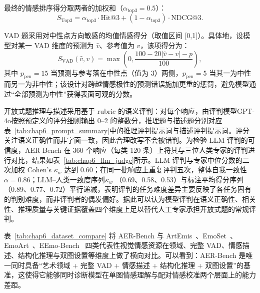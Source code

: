 最终的情感排序得分取两者的加权和（$\alpha_{\text{top3}}=0.5$）：
\begin{equation}
S_{\text{Top3}}=\alpha_{\text{top3}}\cdot\mathrm{Hit@3}+(1-\alpha_{\text{top3}})\cdot\mathrm{NDCG@3}.
\label{eq:chap6_stop3}
\end{equation}

VAD 题采用对中性点方向敏感的均值情感得分（取值区间 [0,1]）。具体地，设模型对某一 VAD 维度的预测为 $\hat{v}$、参考值为 $v$，该项得分为：
\begin{equation}
S_{\text{VAD}}(\hat{v},v)=\max\left(0,\frac{100-20|\hat{v}-v|-p}{100}\right),
\label{eq:chap6_svad}
\end{equation}
其中 $p_{\text{pen}}=15$ 当预测与参考落在中性点（值为 3）两侧，$p_{\text{pen}}=5$ 当其一为中性而另一为非中性；该设计对跨越情感极性的预测错误施加更重的惩罚，避免模型通过“全部预测为中性”获得表面可观的分数。

开放式题推理与描述采用基于 rubric 的语义评判：对每个响应，由评判模型GPT-4o按照预定义的评分细则输出 0--2 的整数分，推理题与描述题分别对应表~\ref{tab:chap6_prompt_summary}中的推理评判提示词与描述评判提示词。评分关注语义正确性而非字面一致，因此合理改写不会被错判。为检验 LLM 评判的可信度，AER-Bench 在 360 个响应（每类 120 条）上将其与三位人类专家的评判进行对比，结果如表~\ref{tab:chap6_llm_judge}所示。LLM 评判与专家中位分数的二次加权 Cohen's $\kappa_w$ 达到 0.60；在同一批响应上重复评判五次，整体自我一致性 $\alpha=0.86$；LLM--人类一致度序列$\kappa_w$ （0.69、0.58、0.53）与标注平均得分序列（0.89、0.77、0.72）平行递减，表明评判的任务难度差异主要反映了各任务固有的判别难度，而非评判者的偶发偏好。据此可以认为模型评判在语义正确性、相关性、推理质量与关键证据覆盖四个维度上足以替代人工专家承担开放式题的常规评判。

表~\ref{tab:chap6_dataset_compare} 将 AER-Bench 与 ArtEmis~\cite{achlioptas2021artemis}、EmoSet~\cite{yang2023emoset}、EmoArt~\cite{emoart2025}、EEmo-Bench~\cite{eemobench2025} 四类代表性视觉情感资源在领域、完整 VAD、情感描述、结构化推理与双图设置等维度上做了横向对比。可以看到：AER-Bench 是唯一同时具备“艺术领域 + 完整 VAD + 情感描述 + 结构化推理 + 双图设置”的基准，这使得它能够同时诊断模型在单图情感理解与配对情感校准两个层面上的能力差距。

